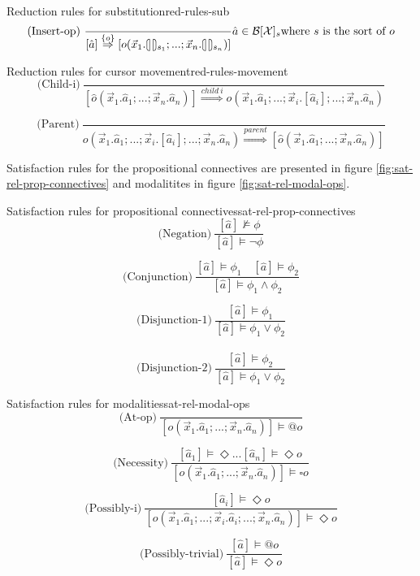 \begin{myfigure}{Reduction rules for substitution}{red-rules-sub}
    \[
        \text{(Insert-op)} \ \frac{}{[\hat{a}] \stackrel{\{ o \}}{\Rightarrow} [o(\vec{x}_1.\hole_{s_1};...;\vec{x}_n.\hole_{s_n})]} \hat{a} \in \mathcal{B}[\mathcal{X}]_s \text{where } s \text{ is the sort of } o
    \]
\end{myfigure}

\begin{myfigure}{Reduction rules for cursor movement}{red-rules-movement}
    \[
        \text{(Child-i)} \ \frac{}{[\hat{o}(\vec{x}_1.\hat{a}_1;...;\vec{x}_n.\hat{a}_n)] \stackrel{child \ i}{\Rightarrow} o(\vec{x}_1.\hat{a}_1;...;\vec{x}_i.[\hat{a}_i];...;\vec{x}_n.\hat{a}_n)}
    \]

    \[
        \text{(Parent)} \ \frac{}{o(\vec{x}_1.\hat{a}_1;...;\vec{x}_i.[\hat{a}_i];...;\vec{x}_n.\hat{a}_n) \stackrel{parent}{\Rightarrow} [\hat{o}(\vec{x}_1.\hat{a}_1;...;\vec{x}_n.\hat{a}_n)]}
    \]
\end{myfigure}

Satisfaction rules for the propositional connectives are presented in figure \ref{fig:sat-rel-prop-connectives} and modalitites in figure \ref{fig:sat-rel-modal-ops}.

\begin{myfigure}{Satisfaction rules for propositional connectives}{sat-rel-prop-connectives}
    \[
        \text{(Negation)} \ \frac{[\hat{a}] \not\models \phi}{[\hat{a}] \models \neg \phi}
    \]

    \[
        \text{(Conjunction)} \ \frac{[\hat{a}] \models \phi_1 \quad [\hat{a}] \models \phi_2}{[\hat{a}] \models \phi_1 \land \phi_2}
    \]

    \[
        \text{(Disjunction-1)} \ \frac{[\hat{a}] \models \phi_1}{[\hat{a}] \models \phi_1 \lor \phi_2}
    \]
    \\
    \[
        \text{(Disjunction-2)} \ \frac{[\hat{a}] \models \phi_2}{[\hat{a}] \models \phi_1 \lor \phi_2}
    \]
\end{myfigure}

\begin{myfigure}{Satisfaction rules for modalities}{sat-rel-modal-ops}
    \[
        \text{(At-op)} \ \frac{}{[o(\vec{x}_1.\hat{a}_1;...;\vec{x}_n.\hat{a}_n)] \models @o}
    \]

    \[
        \text{(Necessity)} \ \frac{[\hat{a}_1] \models \Diamond ... [\hat{a}_n] \models \Diamond o}{[o(\vec{x}_1.\hat{a}_1;...;\vec{x}_n.\hat{a}_n)] \models \square o}
    \]

    \[
        \text{(Possibly-i)} \ \frac{[\hat{a}_i] \models \Diamond o}{[o(\vec{x}_1.\hat{a}_1;...;\Vec{x}_i.\hat{a}_i;...;\vec{x}_n.\hat{a}_n)] \models \Diamond o}
    \]

    \[
        \text{(Possibly-trivial)} \ \frac{[\hat{a}] \models @o}{[\hat{a}] \models \Diamond o}
    \]
\end{myfigure}

